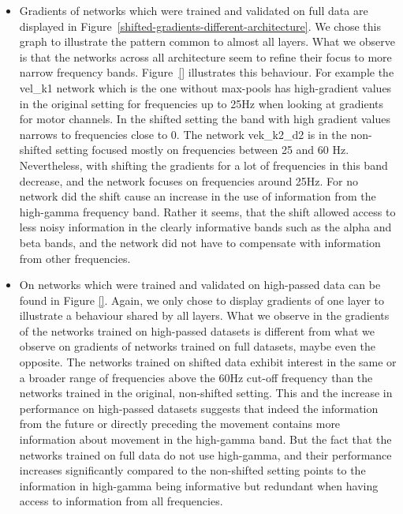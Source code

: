 \begin{itemize}
    \item Gradients of networks which were trained and validated on full data are displayed in Figure~\ref{shifted-gradients-different-architecture}.
    We chose this graph to illustrate the pattern common to almost all layers.
    What we observe is that the networks across all architecture seem to refine their focus to more narrow frequency bands.
    Figure~\ref{} illustrates this behaviour.
    For example the vel\_k1 network which is the one without max-pools has high-gradient values in the original setting for frequencies up to 25Hz when looking at gradients for motor channels.
    In the shifted setting the band with high gradient values narrows to frequencies close to 0.
    The network vek\_k2\_d2 is in the non-shifted setting focused mostly on frequencies between 25 and 60 Hz. Nevertheless, with shifting the gradients for a lot of frequencies in this band decrease, and the network focuses on frequencies around 25Hz. For no network did the shift cause an increase in the use of information from the high-gamma frequency band.
    Rather it seems, that the shift allowed access to less noisy information in the clearly informative bands such as the alpha and beta bands, and the network did not have to compensate with information from other frequencies.
    \item On networks which were trained and validated on high-passed data can be found in Figure \ref{}.
    Again, we only chose to display gradients of one layer to illustrate a behaviour shared by all layers.
    What we observe in the gradients of the networks trained on high-passed datasets is different from what we observe on gradients of networks trained on full datasets, maybe even the opposite.
    The networks trained on shifted data exhibit interest in the same or a broader range of frequencies above the 60Hz cut-off frequency than the networks trained in the original, non-shifted setting.
    This and the increase in performance on high-passed datasets suggests that indeed the information from the future or directly preceding the movement contains more information about movement in the high-gamma band.
    But the fact that the networks trained on full data do not use high-gamma, and their performance increases significantly compared to the non-shifted setting points to the information in high-gamma being informative but redundant when having access to information from all frequencies.
\end{itemize}

